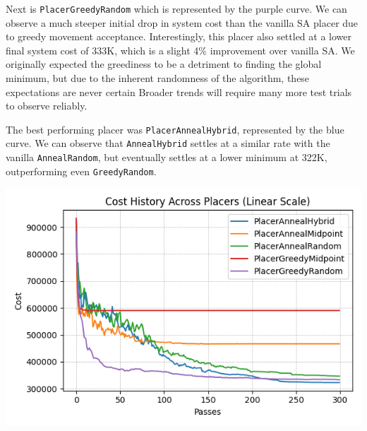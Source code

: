 Next is \texttt{PlacerGreedyRandom} which is represented by the purple curve.
We can observe a much steeper initial drop in system cost than the vanilla SA placer due to greedy movement acceptance.
Interestingly, this placer also settled at a lower final system cost of 333K, which is a slight 4\% improvement over vanilla SA.
We originally expected the greediness to be a detriment to finding the global minimum, but due to the inherent randomness of the algorithm, these expectations are never certain 
Broader trends will require many more test trials to observe reliably.

The best performing placer was \texttt{PlacerAnnealHybrid}, represented by the blue curve.
We can observe that \texttt{AnnealHybrid} settles at a similar rate with the vanilla \texttt{AnnealRandom}, but eventually settles at a lower minimum at 322K, outperforming even \texttt{GreedyRandom}. 


{
    \centering
    \includegraphics[width=\columnwidth]{figures/results/combined_cost_history_linear.png}
    \label{fig:placers_overlay}
}


